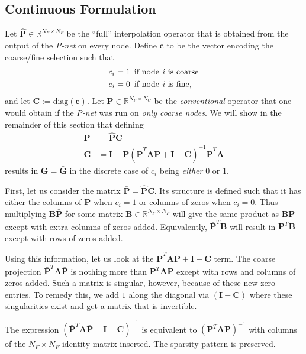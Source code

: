 \documentclass{article}
\newcommand{\mat}[1]{\bm{{#1}}}
\renewcommand{\vec}[1]{\bm{{#1}}}
\newcommand{\hquad}{\enskip}
\begin{document}
\subsection{Continuous Formulation}
Let $\hat{\mat{P}}\in\mathbb{R}^{N_F\times N_F}$ be the ``full'' interpolation operator that is obtained from the output of the \textit{P-net} on every node.  Define $\vec{c}$ to be the vector encoding the coarse/fine selection such that
\begin{align*}
  c_i &= 1 \hquad \text{if node \textit{i} is coarse} \\
  c_i &= 0 \hquad \text{if node \textit{i} is fine},
\end{align*}
and let $\mat{C}:=\text{diag}\left(\vec{c}\right)$.  Let $\mat{P}\in\mathbb{R}^{N_F \times N_C}$ be the \textit{conventional} operator that one would obtain if the \textit{P-net} was run on \textit{only coarse nodes}.  We will show in the remainder of this section that defining
\begin{align}
  \bar{\mat{P}} &= \hat{\mat{P}}\mat{C} \\
  \bar{\mat{G}} &= \mat{I} - \bar{\mat{P}}\left(\bar{\mat{P}}^T \mat{A} \bar{\mat{P}} + \mat{I} - \mat{C}\right)^{-1} \bar{\mat{P}}^T \mat{A}
\end{align}
results in $\mat{G} = \bar{\mat{G}}$ in the discrete case of $c_i$ being \textit{either} 0 or 1.

First, let us consider the matrix $\bar{\mat{P}} = \hat{\mat{P}}\mat{C}$.  Its structure is defined such that it has either the columns of $\mat{P}$ when $c_i=1$ or columns of zeros when $c_i=0$.  Thus multiplying $\mat{B}\bar{\mat{P}}$ for some matrix $\mat{B}\in\mathbb{R}^{N_F \times N_F}$ will give the same product as $\mat{B}\mat{P}$ except with extra columns of zeros added. Equivalently, $\bar{\mat{P}}^T\mat{B}$ will result in $\mat{P}^T\mat{B}$ except with rows of zeros added.

Using this information, let us look at the $\bar{\mat{P}}^T\mat{A}\bar{\mat{P}} + \mat{I} - \mat{C}$ term.  The coarse projection $\bar{\mat{P}}^T\mat{A}\bar{\mat{P}}$ is nothing more than $\mat{P}^T\mat{A}\mat{P}$ except with rows and columns of zeros added.  Such a matrix is singular, however, because of these new zero entries.  To remedy this, we add $1$ along the diagonal via $(\mat{I}-\mat{C})$ where these singularities exist and get a matrix that is invertible.

The expression $\left(\bar{\mat{P}}^T\mat{A}\bar{\mat{P}} + \mat{I} - \mat{C}\right)^{-1}$ is equivalent to $\left(\mat{P}^T\mat{A}\mat{P}\right)^{-1}$ with columns of the $N_F \times N_F$ identity matrix inserted.  The sparsity pattern is preserved.
\end{document}
